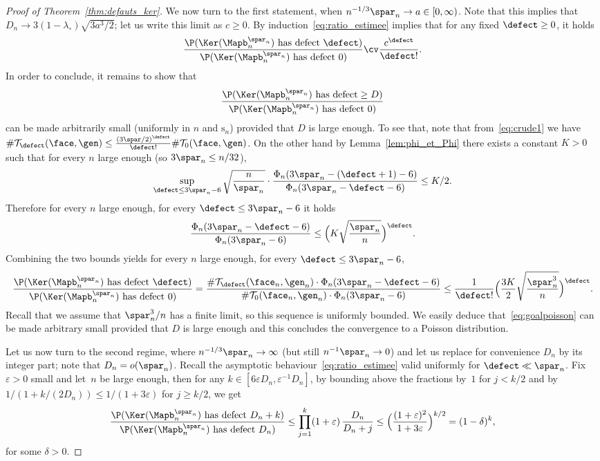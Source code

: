 \begin{proof}[Proof of Theorem~\ref{thm:defauts_ker}]
We now turn to the first statement, when $n^{-1/3} \spar_n \to a \in [0,\infty)$. Note that this implies that $D_n \to 3 (1-\lambda_{\circ}) \sqrt{3 a^3 / 2}$; let us write this limit as $c \ge 0$.
By induction~\eqref{eq:ratio_estimee} implies that for any fixed $\defect\ge0$, it holds
\[
\frac{\P(\Ker(\Mapb_n^{\spar_n}) \textrm{ has defect } \defect)}{\P(\Ker(\Mapb_n^{\spar_n}) \textrm{ has defect } 0)}
\cv \frac{c^\defect}{\defect!}.
\]
In order to conclude, it remains to show that
\begin{equation}\label{eq:goalpoisson}
\frac{\P(\Ker(\Mapb_n^{\spar_n}) \textrm{ has defect} \geq D)}{\P(\Ker(\Mapb_n^{\spar_n}) \textrm{ has defect } 0)}
\end{equation}
can be made arbitrarily small (uniformly in $n$ and $\mathrm{s}_{n}$) provided that $D$ is large enough. To see that, note that from~\eqref{eq:crude1} we have $\# \mathcal{T}_{\defect}(\face,\gen) \le \frac{(3\spar/2)^\defect}{\defect!} \# \mathcal{T}_{0}(\face,\gen)$.
On the other hand by Lemma~\ref{lem:phi_et_Phi} there exists a constant $K>0$ such that for every $n$ large enough (so \eg $3\spar_n \le n/32$),
\[
\sup_{\defect \le 3\spar_n-6} \sqrt{\frac{n}{\spar_n}} \cdot \frac{\Phi_{n}(3\spar_n-(\defect+1)-6 )}{\Phi_{n}(3\spar_n-\defect-6 )}
\le K/2.
\]
Therefore for every $n$ large enough, for every $\defect \le 3\spar_n-6$ it holds
\[
\frac{\Phi_{n}(3\spar_n-\defect-6 )}{\Phi_{n}(3\spar_n-6 )} \le \Bigl(K \sqrt{\frac{\spar_n}{n}}\Bigr)^\defect.
\]
Combining the two bounds yields for every $n$ large enough, for every $\defect \le 3\spar_n-6$,
\[
\frac{\P(\Ker(\Mapb_n^{\spar_n}) \textrm{ has defect } \defect)}{\P(\Ker(\Mapb_n^{\spar_n}) \textrm{ has defect } 0)}
= \frac{\#\mathcal{T}_\defect(\face_n,\gen_n) \cdot \Phi_{n}(3\spar_n-\defect-6)}{\# \mathcal{T}_0(\face_n,\gen_n) \cdot \Phi_{n}(3\spar_n-6 )}
\le \frac{1}{\defect!} \Bigl(\frac{3K}{2} \sqrt{\frac{\spar_n^3}{n}}\Bigr)^\defect.
\]
Recall that we assume that $\spar_n^3/n$ has a finite limit, so this sequence is uniformly bounded. We easily deduce that~\eqref{eq:goalpoisson} can be made arbitrary small provided that $D$ is large enough and this concludes the convergence to a Poisson distribution.

Let us now turn to the second regime, where $n^{-1/3} \spar_n \to \infty$ (but still $n^{-1} \spar_n \to 0$) and let us replace for convenience $D_n$ by its integer part; note that $D_n = o(\spar_n)$.
Recall the asymptotic behaviour~\eqref{eq:ratio_estimee} valid uniformly for $\defect \ll \spar_n$.
Fix $\varepsilon > 0$ small and let~$n$ be large enough, then for any $k \in [6\varepsilon D_n, \varepsilon^{-1} D_n]$, by bounding above the fractions by~$1$ for $j<k/2$ and by $1/(1+k/(2D_n)) \le 1/(1+3\varepsilon)$ for $j \ge k/2$, we get
\[
\frac{\P(\Ker(\Mapb_n^{\spar_n}) \textrm{ has defect } D_n+k)}{\P(\Ker(\Mapb_n^{\spar_n}) \textrm{ has defect } D_n)}
\le \prod_{j=1}^k (1+\varepsilon)\, \frac{D_n}{D_n+j}
\le \Bigl(\frac{(1+\varepsilon)^2}{1+3\varepsilon}\Bigr)^{k/2}
= (1-\delta)^{k},
\]
for some $\delta >0$.


\end{proof}
